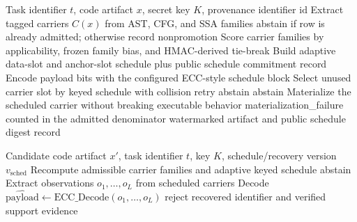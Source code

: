 \begin{algorithm}[!htbp]
\caption{SemCodebook Embed Protocol}
\label{alg:semcodebook}
\begin{algorithmic}[1]
\Require Task identifier $t$, code artifact $x$, secret key $K$, provenance identifier $\mathrm{id}$
\State Extract tagged carriers $C(x)$ from AST, CFG, and SSA families
  \State \Return abstain if row is already admitted; otherwise record nonpromotion
\EndIf
\State Score carrier families by applicability, frozen family bias, and HMAC-derived tie-break
\State Build adaptive data-slot and anchor-slot schedule plus public schedule commitment record
\State Encode payload bits with the configured ECC-style schedule block
  \State Select unused carrier slot by keyed schedule with collision retry
    \State \Return abstain
    \State \Return abstain
  \EndIf
  \State Materialize the scheduled carrier without breaking executable behavior
    \State \Return materialization\_failure counted in the admitted denominator
  \EndIf
\EndFor
\State \Return watermarked artifact and public schedule digest record
\end{algorithmic}
\end{algorithm}

\begin{algorithm}[!htbp]
\caption{SemCodebook Recover Protocol}
\label{alg:semcodebook-recover}
\begin{algorithmic}[1]
\Require Candidate code artifact $x'$, task identifier $t$, key $K$, schedule/recovery version $v_{\mathrm{sched}}$
\State Recompute admissible carrier families and adaptive keyed schedule
  \State \Return abstain
\EndIf
\State Extract observations $o_1,\ldots,o_L$ from scheduled carriers
\State Decode $\widehat{\mathrm{payload}}\gets \mathrm{ECC\_Decode}(o_1,\ldots,o_L)$
  \State \Return reject
\Else
  \State \Return recovered identifier and verified support evidence
\EndIf
\end{algorithmic}
\end{algorithm}

\FloatBarrier

